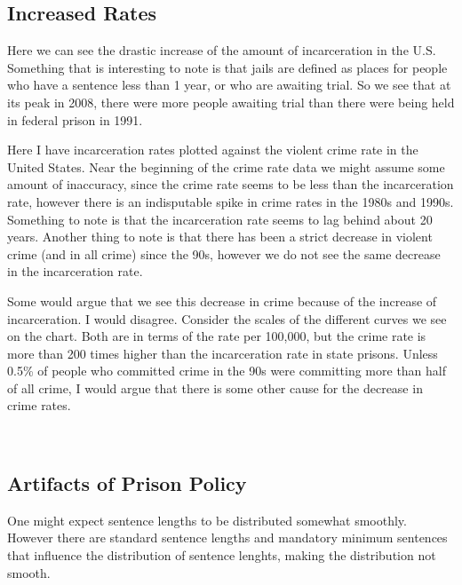 \documentclass[11pt]{article}
\begin{document}
\hypertarget{increased-rates}{%
\subsection{Increased Rates}\label{increased-rates}}

Here we can see the drastic increase of the amount of incarceration in
the U.S. Something that is interesting to note is that jails are defined
as places for people who have a sentence less than 1 year, or who are
awaiting trial. So we see that at its peak in 2008, there were more
people awaiting trial than there were being held in federal prison in
1991.

Here I have incarceration rates plotted against the violent crime rate
in the United States. Near the beginning of the crime rate data we might
assume some amount of inaccuracy, since the crime rate seems to be less
than the incarceration rate, however there is an indisputable spike in
crime rates in the 1980s and 1990s. Something to note is that the
incarceration rate seems to lag behind about 20 years. Another thing to
note is that there has been a strict decrease in violent crime (and in
all crime) since the 90s, however we do not see the same decrease in the
incarceration rate.

Some would argue that we see this decrease in crime because of the
increase of incarceration. I would disagree. Consider the scales of the
different curves we see on the chart. Both are in terms of the rate per
100,000, but the crime rate is more than 200 times higher than the
incarceration rate in state prisons. Unless 0.5\% of people who
committed crime in the 90s were committing more than half of all crime,
I would argue that there is some other cause for the decrease in crime
rates.

    \begin{center}
    \end{center}
    { \hspace*{\fill} \\}
    
    \hypertarget{artifacts-of-prison-policy}{%
\subsection{Artifacts of Prison
Policy}\label{artifacts-of-prison-policy}}

One might expect sentence lengths to be distributed somewhat smoothly.
However there are standard sentence lengths and mandatory minimum
sentences that influence the distribution of sentence lenghts, making
the distribution not smooth.
\end{document}
